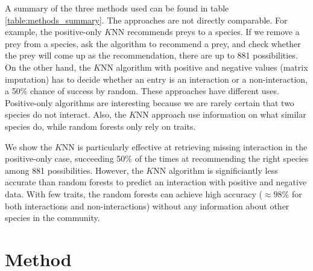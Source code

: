 \documentclass[letterpaper]{article}
\begin{document}
A summary of the three methods used can be found in table
\ref{table:methods_summary}. The approaches are not directly comparable. For
example, the positive-only $K$NN recommends preys to a species. If we remove a
prey from a species, ask the algorithm to recommend a prey, and check whether
the prey will come up as the recommendation, there are up to 881 possibilities.
On the other hand, the $K$NN algorithm with positive and negative values
(matrix imputation) has to decide whether an entry is an interaction or a
non-interaction, a 50\% chance of success by random. These approaches have
different uses. Positive-only algorithms are interesting because we are rarely
certain that two species do not interact. Also, the $K$NN approach use
information on what similar species do, while random forests only rely
on traits.

We show the $K$NN is particularly effective at retrieving missing interaction
in the positive-only case, succeeding 50\% of the times at recommending the
right species among 881 possibilities. However, the $K$NN algorithm is
significiantly less accurate than random forests to predict an interaction with
positive and negative data. With few traits, the random forests can achieve
high accuracy ($\approx98\%$ for both interactions and non-interactions) without
any information about other species in the community. %

\section{Method}
\end{document}
